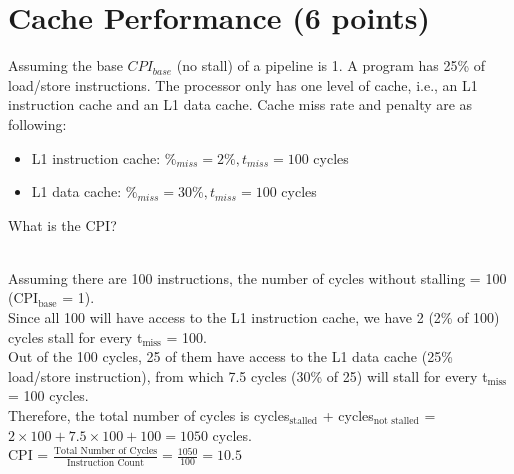 \documentclass{article}
\begin{document}
\begin{enumerate}
{{        }%
    }
\end{enumerate}

\section{Cache Performance (6 points)}
Assuming the base $CPI_{base}$ (no stall) of a pipeline is 1. A program has 25\% of load/store instructions. The processor only has one level of cache, i.e., an L1 instruction cache and an L1 data cache. Cache miss rate and penalty are as following:
\begin{itemize}
    \item L1 instruction cache: $\%_{miss} = 2\%, t_{miss} = 100$ cycles
    \item L1 data cache: $\%_{miss} = 30\%, t_{miss} = 100$ cycles
\end{itemize}
What is the CPI?\\ \\
\noindent\fbox
{%
    \parbox{\linewidth}
    {%
        Assuming there are 100 instructions, the number of cycles without stalling = 100 (CPI$_{\text{base}}$ = 1). \\
        Since all 100 will have access to the L1 instruction cache, we have 2 (2\% of 100) cycles stall for every t$_{\text{miss}}$ = 100. \\
        Out of the 100 cycles, 25 of them have access to the L1 data cache (25\% load/store instruction), from which 7.5 cycles (30\% of 25) will stall for every t$_{\text{miss}}$ = 100 cycles. \\
        Therefore, the total number of cycles is cycles$_{\text{stalled}}$ + cycles$_{\text{not stalled}}$ = $2 \times 100 + 7.5 \times 100 + 100 = 1050$ cycles. \\
        CPI = $\frac{\text{Total Number of Cycles}}{\text{Instruction Count}} = \frac{1050}{100} = 10.5$ 
    }%
}
\end{document}

